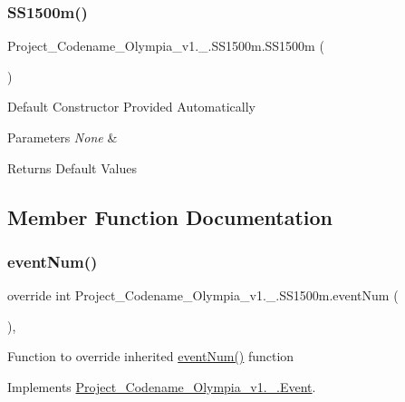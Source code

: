 \subsubsection{\texorpdfstring{S\+S1500m()}{SS1500m()}}
{\footnotesize\ttfamily Project\+\_\+\+Codename\+\_\+\+Olympia\+\_\+v1.\+\_.\+S\+S1500m.\+S\+S1500m (\begin{DoxyParamCaption}{ }\end{DoxyParamCaption})\hspace{0.3cm}{\ttfamily [inline]}}

Default Constructor Provided Automatically 
\begin{DoxyParams}{Parameters}
{\em None} & \\
\hline
\end{DoxyParams}
\begin{DoxyReturn}{Returns}
Default Values 
\end{DoxyReturn}


\subsection{Member Function Documentation}
\mbox{\label{classProject__Codename__Olympia__v1_1_1__0_1_1SS1500m_a012967ff7e84eb9d1578705ad465aecc}} 
\subsubsection{\texorpdfstring{event\+Num()}{eventNum()}}
{\footnotesize\ttfamily override int Project\+\_\+\+Codename\+\_\+\+Olympia\+\_\+v1.\+\_.\+S\+S1500m.\+event\+Num (\begin{DoxyParamCaption}{ }\end{DoxyParamCaption})\hspace{0.3cm}{\ttfamily [inline]}, {\ttfamily [virtual]}}

Function to override inherited \hyperlink{classProject__Codename__Olympia__v1_1_1__0_1_1SS1500m_a012967ff7e84eb9d1578705ad465aecc}{event\+Num()} function 

Implements \hyperlink{classProject__Codename__Olympia__v1_1_1__0_1_1Event_ad1154ef4dd1dec29d8ebf5614d84b1f3}{Project\+\_\+\+Codename\+\_\+\+Olympia\+\_\+v1.\+\_.\+Event}.

